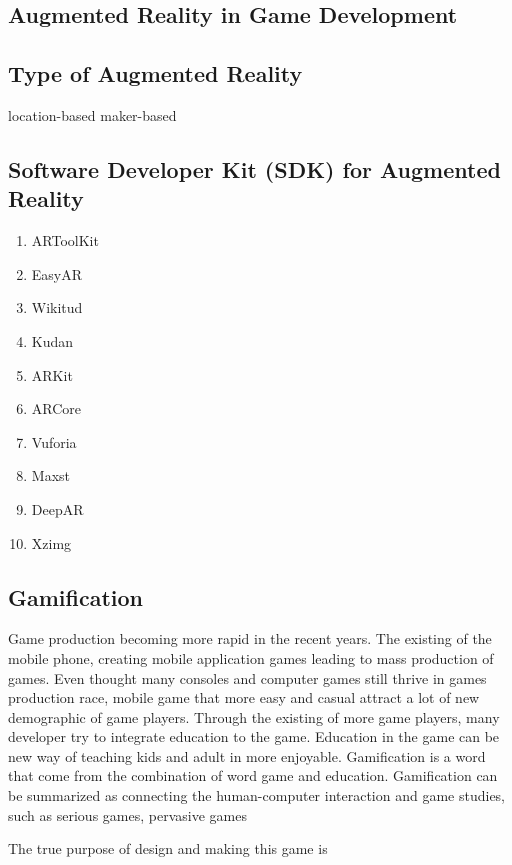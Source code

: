 \documentclass[12pt]{article}
\begin{document}
\subsection{Augmented Reality in Game Development}

\subsection{Type of Augmented Reality}

location-based
\newline
maker-based

\subsection{Software Developer Kit (SDK) for Augmented Reality}

\begin{enumerate}
    \item ARToolKit
    \item EasyAR
    \item Wikitud
    \item Kudan
    \item ARKit
    \item ARCore
    \item Vuforia
    \item Maxst
    \item DeepAR
    \item Xzimg
\end{enumerate}

\subsection{Gamification}
Game production becoming more rapid in the recent years. The existing of the mobile phone, creating mobile application games leading to mass production of games. Even thought many consoles and computer games still thrive in games production race, mobile game that more easy and casual attract a lot of new demographic of game players. Through the existing of more game players, many developer try to integrate education to the game. Education in the game can be new way of teaching kids and adult in more enjoyable. Gamification is a word that come from the combination of word game and education. Gamification \cite{deterding2011game} can be summarized as connecting the human-computer interaction and game studies, such as serious games, pervasive games

\par The true purpose of design and making this game is 
\end{document}
